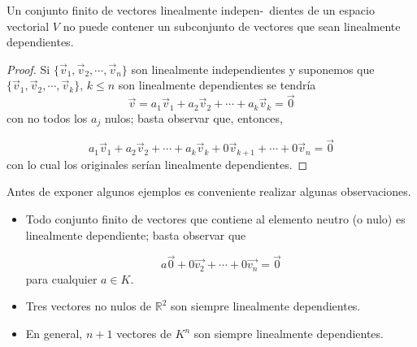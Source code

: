 \bigskip

\bigskip



\begin{theorem}
    Un conjunto finito de vectores linealmente indepen-\ dientes de un espacio vectorial $V$ no puede contener un subconjunto de vectores que sean linealmente dependientes. 
\begin{proof}
    

Si $\{ \vec{v}_1,\vec{v}_2,\cdots, \vec{v}_n\}$ son linealmente independientes y suponemos que $\{ \vec{v}_1,\vec{v}_2,\cdots, \vec{v}_k\}$, $k\leq n$ son linealmente dependientes se tendría 
$$\vec{v}=a_1\vec{v}_1+a_2\vec{v}_2+\cdots +a_k\vec{v}_k=\vec{0}$$
con no todos los $a_j$ nulos; basta observar que, entonces,


$$a_1\vec{v}_1+a_2\vec{v}_2+\cdots +a_k\vec{v}_k+0\vec{v}_{k+1}+ \cdots + 0\vec{v}_n=\vec{0}$$
con lo cual los originales serían linealmente dependientes.
\end{proof}
\end{theorem} 

\bigskip

Antes de exponer algunos ejemplos es conveniente realizar algunas observaciones.
\begin{remark}

\begin{itemize}

\item 

Todo conjunto finito de vectores que contiene al elemento neutro (o nulo) es linealmente dependiente; basta observar que 

$$a \vec{0}+0\vec{v_2}+\cdots +0\vec{v_n}=\vec{0}$$
para cualquier $a\in K $.





\item 
Tres vectores no nulos de $\mathbb{R}^2$ son siempre linealmente dependientes.



\item 
En general, $n+1$  vectores  de $K^n$ son siempre linealmente dependientes.

\end{itemize}
\end{remark}
\bigskip



\bigskip


